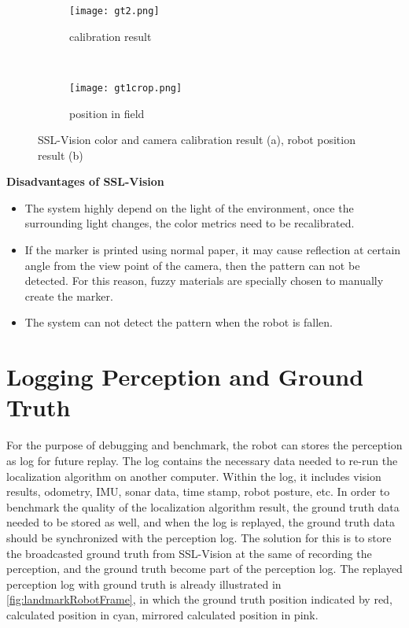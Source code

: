 \begin{figure}[h!]
        \centering
        \begin{subfigure}[h]{0.59\textwidth}
                \texttt{[image: gt2.png]}
                \caption{calibration result}
                \label{fig:calibration}
        \end{subfigure}%
        ~ %
        \begin{subfigure}[h]{0.41\textwidth}
                \texttt{[image: gt1crop.png]}
                \caption{position in field}
                \label{fig:position}
        \end{subfigure}%
	\caption[SSL-Vision color and camera calibration result, and robot position result]{SSL-Vision color and camera calibration result (a), robot position result (b)}
	\label{fig:sslVision result}
\end{figure}


\noindent\textbf{Disadvantages of SSL-Vision}
\begin{itemize}
  \item The system highly depend on the light of the environment, once the surrounding light changes, the color metrics need to be recalibrated. 
  \item If the marker is printed using normal paper, it may cause reflection at certain angle from the view point of the camera, then the pattern can not be detected. For this reason, fuzzy materials are specially chosen to manually create the marker. 
  \item The system can not detect the pattern when the robot is fallen.
\end{itemize}

\section{Logging Perception and Ground Truth}
\label{sub:Logging Perception and Ground Truth}
For the purpose of debugging and benchmark, the robot can stores the perception as log for future replay. The log contains the necessary data needed to re-run the localization algorithm on another computer. Within the log, it includes vision results, odometry, \gls{IMU}, sonar data, time stamp, robot posture, etc. In order to benchmark the quality of the localization algorithm result, the ground truth data needed to be stored as well, and when the log is replayed, the ground truth data should be synchronized with the perception log. The solution for this is to store the broadcasted ground truth from SSL-Vision at the same of recording the perception, and the ground truth become part of the perception log. The replayed perception log with ground truth is already illustrated in \autoref{fig:landmarkRobotFrame}, in which the ground truth position indicated by red, calculated position in cyan, mirrored calculated position in pink.

